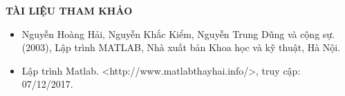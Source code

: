 \documentclass[12pt,a4paper]{article}
\begin{document}
\begin{itemize}
\begin{center}
\begin{figure}[H]
\begin{center}
	\end{center}
		\caption{}
		\label{refdothi22}
	\end{figure}
\end{center}
\end{itemize}
\newpage
\listoffigures
\newpage
\begin{center}
	\textbf{TÀI LIỆU THAM KHẢO}\\
\end{center}
\begin{itemize}
	\item Nguyễn Hoàng Hải, Nguyễn Khắc Kiểm, Nguyễn Trung Dũng và cộng sự. (2003), Lập trình MATLAB, Nhà xuất bản Khoa học và kỹ thuật, Hà Nội.
	\item Lập trình Matlab. <http://www.matlabthayhai.info/>, truy cập: 07/12/2017.
\end{itemize}
\end{document}
